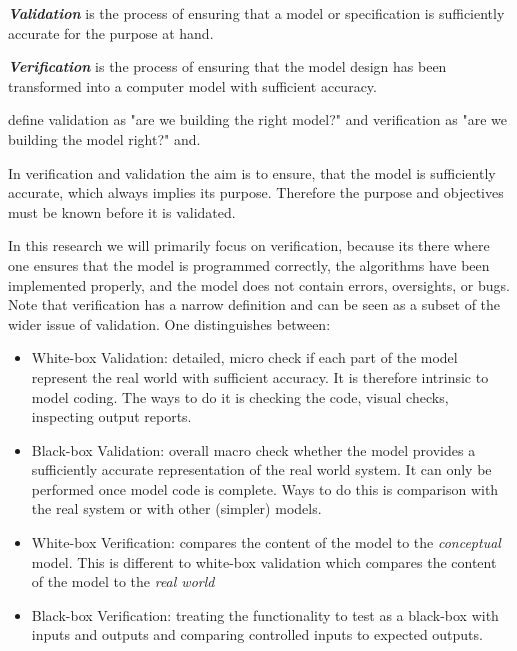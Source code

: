 
\textbf{\textit{Validation}} is the process of ensuring that a model or specification is sufficiently accurate for the purpose at hand.

\textbf{\textit{Verification}} is the process of ensuring that the model design has been transformed into a computer model with sufficient accuracy.

\cite{balci_verification_1998} define validation as "are we building the right model?" and verification as "are we building the model right?" and.

In verification and validation the aim is to ensure, that the model is sufficiently accurate, which always implies its purpose. Therefore the purpose and objectives must be known before it is validated. 

In this research we will primarily focus on verification, because its there where one ensures that the model is programmed correctly, the algorithms have been implemented properly, and the model does not contain errors, oversights, or bugs. Note that verification has a narrow definition and can be seen as a subset of the wider issue of validation. One distinguishes between:

\begin{itemize}
	\item White-box Validation: detailed, micro check if each part of the model represent the real world with sufficient accuracy. It is therefore intrinsic to model coding. The ways to do it is checking the code, visual checks, inspecting output reports. 
	\item Black-box Validation: overall macro check whether the model provides a sufficiently accurate representation of the real world system. It can only be performed once model code is complete. Ways to do this is comparison with the real system or with other (simpler) models.

	\item White-box Verification: compares the content of the model to the \textit{conceptual} model. This is different to white-box validation which compares the content of the model to the \textit{real world}
	\item Black-box Verification: treating the functionality to test as a black-box with inputs and outputs and comparing controlled inputs to expected outputs.

\end{itemize}

